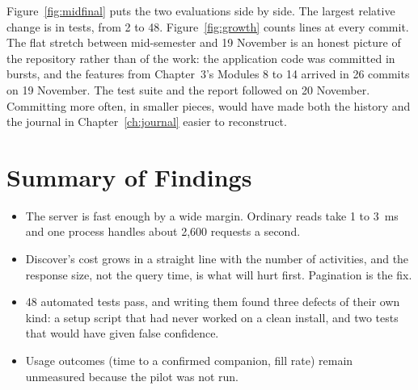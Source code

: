 Figure~\ref{fig:midfinal} puts the two evaluations side by side. The largest relative change
is in tests, from 2 to 48. Figure~\ref{fig:growth} counts lines at every commit. The flat
stretch between mid-semester and 19 November is an honest picture of the repository rather
than of the work: the application code was committed in bursts, and the features from
Chapter~3's Modules 8 to 14 arrived in 26 commits on 19 November. The test suite and the
report followed on 20 November. Committing more often, in smaller pieces, would have made
both the history and the journal in Chapter~\ref{ch:journal} easier to reconstruct.

\section{Summary of Findings}

\begin{itemize}
  \item The server is fast enough by a wide margin. Ordinary reads take 1 to 3~ms and one
        process handles about 2{,}600 requests a second.
  \item Discover's cost grows in a straight line with the number of activities, and the
        response size, not the query time, is what will hurt first. Pagination is the fix.
  \item 48 automated tests pass, and writing them found three defects of their own kind: a
        setup script that had never worked on a clean install, and two tests that would have
        given false confidence.
  \item Usage outcomes (time to a confirmed companion, fill rate) remain unmeasured because
        the pilot was not run.
\end{itemize}

